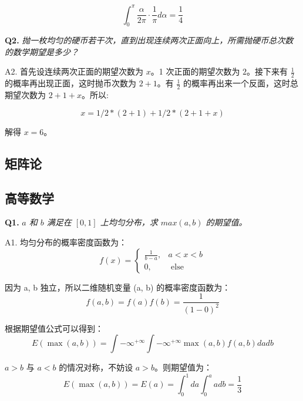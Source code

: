 \documentclass[cn,10pt,math=newtx,citestyle=gb7714-2015,bibstyle=gb7714-2015]{elegantbook}
\begin{document}
\begin{equation}
\int_{0}^{\pi}\frac{\alpha}{2\pi}\cdot\frac{1}{\pi}d\alpha=\frac{1}{4}
\end{equation}

\textbf{Q2.} \textit{抛一枚均匀的硬币若干次，直到出现连续两次正面向上，所需抛硬币总次数的数学期望是多少？}

A2. 首先设连续两次正面的期望次数为 $x$。1 次正面的期望次数为 $2$。接下来有 $\frac{1}{2}$ 的概率再出现正面，这时抛币次数为 $2+1$。有 $\frac{1}{2}$ 的概率再出来一个反面，这时总期望次数为 $2+1+x$。所以:

\begin{equation}
x=1/2 * (2+1) + 1/2 * (2+1+x)
\end{equation}

解得 $x=6$。\\


\subsection{矩阵论}

\subsection{高等数学}

\textbf{Q1.} \textit{$a$ 和 $b$ 满足在 $[0, 1]$ 上均匀分布，求 $max(a, b)$ 的期望值。}

A1. 均匀分布的概率密度函数为：
\begin{equation}
f(x)= \begin{cases}\frac{1}{b-a}, & a<x<b \\ 0, & \text { else }\end{cases}
\end{equation}

因为 a, b 独立，所以二维随机变量 (a, b) 的概率密度函数为：
\begin{equation}
f(a, b)=f(a) f(b)=\frac{1}{(1-0)^{2}}
\end{equation}

根据期望值公式可以得到：
\begin{equation}
E(\max (a, b))=\int-\infty^{+\infty} \int-\infty^{+\infty} \max (a, b) f(a, b) d a d b
\end{equation}

$a>b$ 与 $a<b$ 的情况对称，不妨设 $a>b$。则期望值为：
\begin{equation}
E(\max (a, b))=E(a)=\int_{0}^{1} d a \int_{0}^{a} a d b=\frac{1}{3}
\end{equation}
\end{document}
